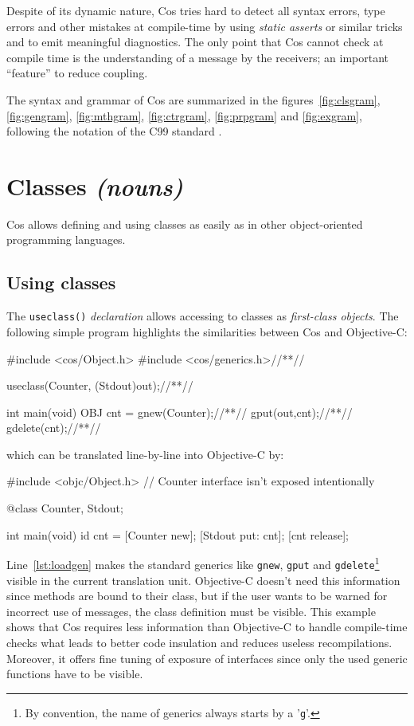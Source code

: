 \documentclass[preprint,10pt]{sigplanconf}
\newcommand{\ProgLang}[1]{{\sc #1}\xspace}
\newcommand{\Cos}       {\ProgLang{Cos}}
\newcommand{\Objc}      {\ProgLang{Objective-C}}
\newcommand{\code}[1]{\lstinline[language=COS,style=samplecode]|#1|}
\begin{document}
Despite of its dynamic nature, \Cos tries hard to detect all syntax errors, type errors and other mistakes at compile-time by using {\em static asserts} or similar tricks and to emit meaningful diagnostics. The only point that \Cos cannot check at compile time is the understanding of a message by the receivers; an important ``feature'' to reduce coupling.


The syntax and grammar of \Cos are summarized in the figures~\ref{fig:clsgram}, \ref{fig:gengram}, \ref{fig:mthgram}, \ref{fig:ctrgram}, \ref{fig:prpgram} and \ref{fig:exgram}, following the notation of the C99 standard \cite{c99}.



\section{Classes {\em (nouns)}\label{sec:cls}}


\Cos allows defining and using classes as easily as in other object-oriented programming languages.

\subsection{Using classes}

The \code{useclass()} {\em declaration} allows accessing to classes as {\em first-class objects}. The following simple program highlights the similarities between \Cos and \Objc:
\begin{COS}[left]
#include <cos/Object.h>
#include <cos/generics.h>//*\label{lst:loadgen}*//

useclass(Counter, (Stdout)out);//*\label{lst:usecls}*//

int main(void) {
  OBJ cnt = gnew(Counter);//*\label{lst:obj}*//
  gput(out,cnt);//*\label{lst:put}*//
  gdelete(cnt);//*\label{lst:end}*//
}
\end{COS}
which can be translated line-by-line into \Objc by:
\begin{OBJC}[left]
#include <objc/Object.h>
// Counter interface isn't exposed intentionally

@class Counter, Stdout;

int main(void) {
  id cnt = [Counter new];
  [Stdout put: cnt];
  [cnt release];
}
\end{OBJC}
Line~\ref{lst:loadgen} makes the standard generics like \code{gnew}, \code{gput} and \code{gdelete}\footnote{By convention, the name of generics always starts by a '\code{g}'.} visible in the current translation unit. \Objc doesn't need this information since methods are bound to their class, but if the user wants to be warned for incorrect use of messages, the class definition must be visible. This example shows that \Cos requires less information than \Objc to handle compile-time checks what leads to better code insulation and reduces useless recompilations. Moreover, it offers fine tuning of exposure of interfaces since only the used generic functions have to be visible.
\end{document}
